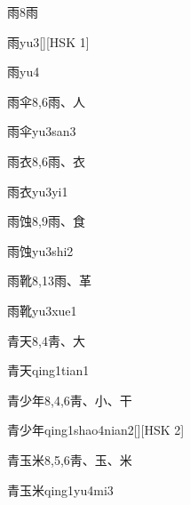 \begin{entry}{雨}{8}{⾬}
  \begin{phonetics}{雨}{yu3}[][HSK 1]
  \end{phonetics}
  \begin{phonetics}{雨}{yu4}
  \end{phonetics}
\end{entry}

\begin{entry}{雨伞}{8,6}{⾬、⼈}
  \begin{phonetics}{雨伞}{yu3san3}
  \end{phonetics}
\end{entry}

\begin{entry}{雨衣}{8,6}{⾬、⾐}
  \begin{phonetics}{雨衣}{yu3yi1}
  \end{phonetics}
\end{entry}

\begin{entry}{雨蚀}{8,9}{⾬、⾷}
  \begin{phonetics}{雨蚀}{yu3shi2}
  \end{phonetics}
\end{entry}

\begin{entry}{雨靴}{8,13}{⾬、⾰}
  \begin{phonetics}{雨靴}{yu3xue1}
  \end{phonetics}
\end{entry}

\begin{entry}{青天}{8,4}{⾭、⼤}
  \begin{phonetics}{青天}{qing1tian1}
  \end{phonetics}
\end{entry}

\begin{entry}{青少年}{8,4,6}{⾭、⼩、⼲}
  \begin{phonetics}{青少年}{qing1shao4nian2}[][HSK 2]
  \end{phonetics}
\end{entry}

\begin{entry}{青玉米}{8,5,6}{⾭、⽟、⽶}
  \begin{phonetics}{青玉米}{qing1yu4mi3}
  \end{phonetics}
\end{entry}

